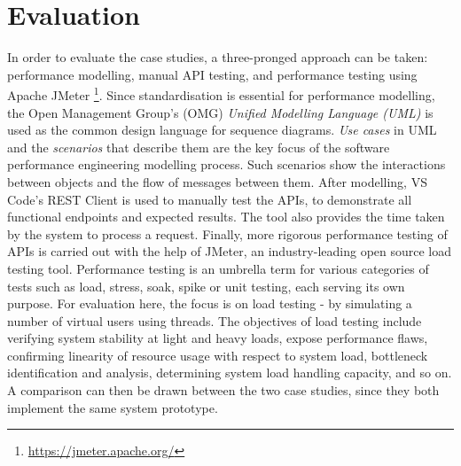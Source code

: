 \section{Evaluation}

In order to evaluate the case studies, a three-pronged approach can be taken: performance modelling, manual API testing, and performance testing using Apache JMeter \footnote{\url{https://jmeter.apache.org/}}. Since standardisation is essential for performance modelling, the Open Management Group's (OMG) \textit{Unified Modelling Language (UML)} is used as the common design language for sequence diagrams. \textit{Use cases} in UML and the \textit{scenarios} that describe them are the key focus of the software performance engineering modelling process. Such scenarios show the interactions between objects and the flow of messages between them. After modelling, VS Code's REST Client is used to manually test the APIs, to demonstrate all functional endpoints and expected results. The tool also provides the time taken by the system to process a request. Finally, more rigorous performance testing of APIs is carried out with the help of JMeter, an industry-leading open source load testing tool. Performance testing is an umbrella term for various categories of tests such as load, stress, soak, spike or unit testing, each serving its own purpose. For evaluation here, the focus is on load testing - by simulating a number of virtual users using threads. The objectives of load testing include verifying system stability at light and heavy loads, expose performance flaws, confirming linearity of resource usage with respect to system load, bottleneck identification and analysis, determining system load handling capacity, and so on. A comparison can then be drawn between the two case studies, since they both implement the same system prototype. 
